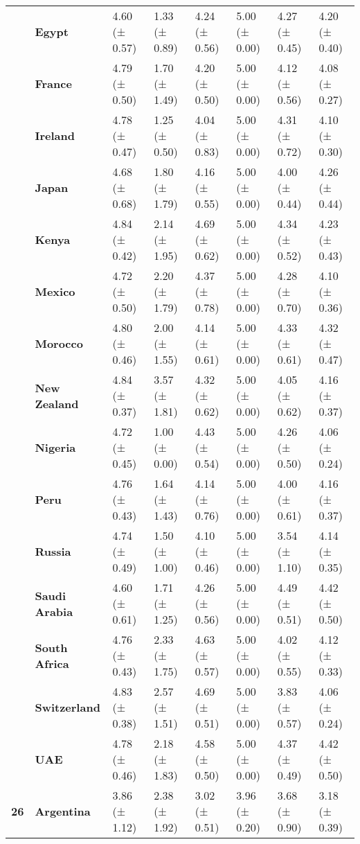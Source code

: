 \begin{longtable}{llllllll}
\textbf{} & \textbf{Egypt} & 4.60 (± 0.57) & 1.33 (± 0.89) & 4.24 (± 0.56) & 5.00 (± 0.00) & 4.27 (± 0.45) & 4.20 (± 0.40) \\
\textbf{} & \textbf{France} & 4.79 (± 0.50) & 1.70 (± 1.49) & 4.20 (± 0.50) & 5.00 (± 0.00) & 4.12 (± 0.56) & 4.08 (± 0.27) \\
\textbf{} & \textbf{Ireland} & 4.78 (± 0.47) & 1.25 (± 0.50) & 4.04 (± 0.83) & 5.00 (± 0.00) & 4.31 (± 0.72) & 4.10 (± 0.30) \\
\textbf{} & \textbf{Japan} & 4.68 (± 0.68) & 1.80 (± 1.79) & 4.16 (± 0.55) & 5.00 (± 0.00) & 4.00 (± 0.44) & 4.26 (± 0.44) \\
\textbf{} & \textbf{Kenya} & 4.84 (± 0.42) & 2.14 (± 1.95) & 4.69 (± 0.62) & 5.00 (± 0.00) & 4.34 (± 0.52) & 4.23 (± 0.43) \\
\textbf{} & \textbf{Mexico} & 4.72 (± 0.50) & 2.20 (± 1.79) & 4.37 (± 0.78) & 5.00 (± 0.00) & 4.28 (± 0.70) & 4.10 (± 0.36) \\
\textbf{} & \textbf{Morocco} & 4.80 (± 0.46) & 2.00 (± 1.55) & 4.14 (± 0.61) & 5.00 (± 0.00) & 4.33 (± 0.61) & 4.32 (± 0.47) \\
\textbf{} & \textbf{New Zealand} & 4.84 (± 0.37) & 3.57 (± 1.81) & 4.32 (± 0.62) & 5.00 (± 0.00) & 4.05 (± 0.62) & 4.16 (± 0.37) \\
\textbf{} & \textbf{Nigeria} & 4.72 (± 0.45) & 1.00 (± 0.00) & 4.43 (± 0.54) & 5.00 (± 0.00) & 4.26 (± 0.50) & 4.06 (± 0.24) \\
\textbf{} & \textbf{Peru} & 4.76 (± 0.43) & 1.64 (± 1.43) & 4.14 (± 0.76) & 5.00 (± 0.00) & 4.00 (± 0.61) & 4.16 (± 0.37) \\
\textbf{} & \textbf{Russia} & 4.74 (± 0.49) & 1.50 (± 1.00) & 4.10 (± 0.46) & 5.00 (± 0.00) & 3.54 (± 1.10) & 4.14 (± 0.35) \\
\textbf{} & \textbf{Saudi Arabia} & 4.60 (± 0.61) & 1.71 (± 1.25) & 4.26 (± 0.56) & 5.00 (± 0.00) & 4.49 (± 0.51) & 4.42 (± 0.50) \\
\textbf{} & \textbf{South Africa} & 4.76 (± 0.43) & 2.33 (± 1.75) & 4.63 (± 0.57) & 5.00 (± 0.00) & 4.02 (± 0.55) & 4.12 (± 0.33) \\
\textbf{} & \textbf{Switzerland} & 4.83 (± 0.38) & 2.57 (± 1.51) & 4.69 (± 0.51) & 5.00 (± 0.00) & 3.83 (± 0.57) & 4.06 (± 0.24) \\
\textbf{} & \textbf{UAE} & 4.78 (± 0.46) & 2.18 (± 1.83) & 4.58 (± 0.50) & 5.00 (± 0.00) & 4.37 (± 0.49) & 4.42 (± 0.50) \\
\cline{1-8}
\multirow[t]{19}{*}{\textbf{26}} & \textbf{Argentina} & 3.86 (± 1.12) & 2.38 (± 1.92) & 3.02 (± 0.51) & 3.96 (± 0.20) & 3.68 (± 0.90) & 3.18 (± 0.39) \\

\end{longtable}

